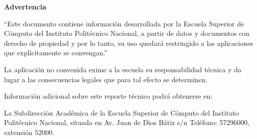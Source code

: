 \begin{titlepage}
\thispagestyle{empty}

\begin{center}
    \textbf{\large Advertencia}
\end{center}

\vspace{1.5cm}

\begin{tcolorbox}[
    enhanced,
    colback=white,
    colframe=azulipn!60,
    boxrule=0.8pt,
    arc=2pt,
    outer arc=2pt,
    frame style={draw=azulipn!60, dashed, line width=0.8pt},
    colframe=azulipn!60,
    left=10pt, right=10pt, top=10pt, bottom=10pt,
]
\setlength{\parskip}{0.8em}
\justifying\itshape

``Este documento contiene información desarrollada por la Escuela Superior de Cómputo del Instituto Politécnico Nacional, a partir de datos y documentos con derecho de propiedad y por lo tanto, su uso quedará restringido a las aplicaciones que explícitamente se convengan.''

La aplicación no convenida exime a la escuela su responsabilidad técnica y da lugar a las consecuencias legales que para tal efecto se determinen.

Información adicional sobre este reporte técnico podrá obtenerse en:

La Subdirección Académica de la Escuela Superior de Cómputo del Instituto Politécnico Nacional, situada en Av. Juan de Dios Bátiz s/n Teléfono: 57296000, extensión 52000.

\end{tcolorbox}

\end{titlepage}
